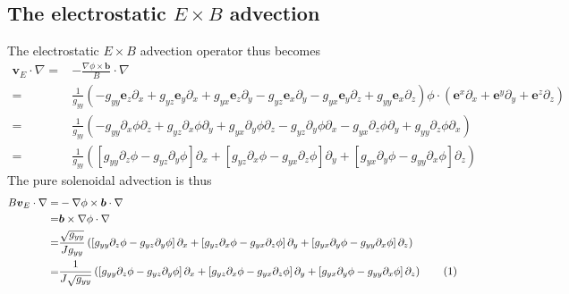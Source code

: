 \documentclass[12pt]{article}
\def\L{\left}
\def\R{\right}
\newcommand{\ve}[1]{\ensuremath{\boldsymbol{#1}}}
\newcommand\numberthis{\addtocounter{equation}{1}\tag{\theequation}}
\begin{document}
\subsection{The electrostatic \texorpdfstring{$E\times B$}{ExB} advection}
%
The electrostatic $E\times B$ advection operator thus becomes
%
\begin{align*}
    \ve{v}_E\cdot\nabla
    =& -\frac{\nabla\phi\times\ve{b}}{B}\cdot\nabla\\
    =&\frac{1}{g_{yy}}
	       \L(
	       - g_{yy}\ve{e}_z\partial_x
	       + g_{yz}\ve{e}_y\partial_x
	       + g_{yx}\ve{e}_z\partial_y
	       - g_{yz}\ve{e}_x\partial_y
	       - g_{yx}\ve{e}_y\partial_z
	       + g_{yy}\ve{e}_x\partial_z
	       \R)
	       \phi
       \cdot\L(\ve{e}^x\partial_x + \ve{e}^y\partial_y + \ve{e}^z\partial_z\R)\\
    =& \frac{1}{g_{yy}}
	       \L(
	       - g_{yy}\partial_x\phi\partial_z
	       + g_{yz}\partial_x\phi\partial_y
	       + g_{yx}\partial_y\phi\partial_z
	       - g_{yz}\partial_y\phi\partial_x
	       - g_{yx}\partial_z\phi\partial_y
	       + g_{yy}\partial_z\phi\partial_x
	       \R)\\
    =& \frac{1}{g_{yy}}
	       \L(
	         \L[
	           g_{yy}\partial_z\phi
	         - g_{yz}\partial_y\phi
	         \R]\partial_x
	       +
	         \L[
	           g_{yz}\partial_x\phi
	         - g_{yx}\partial_z\phi
	         \R]\partial_y
	       +
	         \L[
	           g_{yx}\partial_y\phi
	         - g_{yy}\partial_x\phi
	         \R]\partial_z
	       \R)
\end{align*}
%
The pure solenoidal advection is thus
%
\begin{align*}
    B\ve{v}_E\cdot\nabla
    =& -\nabla\phi\times\ve{b}\cdot\nabla\\
    =& \ve{b} \times \nabla\phi\cdot\nabla\\
    =& \frac{\sqrt{g_{yy}}}{Jg_{yy}}
	       \L(
	         \L[
	           g_{yy}\partial_z\phi
	         - g_{yz}\partial_y\phi
	         \R]\partial_x
	       +
	         \L[
	           g_{yz}\partial_x\phi
	         - g_{yx}\partial_z\phi
	         \R]\partial_y
	       +
	         \L[
	           g_{yx}\partial_y\phi
	         - g_{yy}\partial_x\phi
	         \R]\partial_z
	       \R)\\
    =& \frac{1}{J\sqrt{g_{yy}}}
	       \L(
	         \L[
	           g_{yy}\partial_z\phi
	         - g_{yz}\partial_y\phi
	         \R]\partial_x
	       +
	         \L[
	           g_{yz}\partial_x\phi
	         - g_{yx}\partial_z\phi
	         \R]\partial_y
	       +
	         \L[
	           g_{yx}\partial_y\phi
	         - g_{yy}\partial_x\phi
	         \R]\partial_z
	       \R)
	       \numberthis
	       \label{eq:brackets}
\end{align*}
\end{document}
